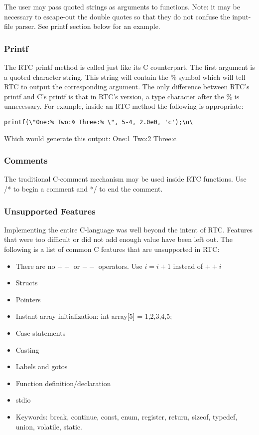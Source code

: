 The user may pass quoted strings as arguments to 
functions. Note: it may be necessary to escape-out the double quotes so that they
do not confuse the input-file parser. See printf section below for an example.

\subsubsection{Printf}

The RTC printf method is called just like its C counterpart. The first argument
is a quoted character string. This string will contain the \% symbol 
which will tell RTC to output the corresponding argument. The only difference
between RTC's printf and C's printf is that in RTC's version, a type character 
after the \% is unnecessary. For example, inside an RTC method
the following is appropriate:

{\ttfamily \begin{verbatim}
printf(\"One:% Two:% Three:% \", 5-4, 2.0e0, 'c');\n\
\end{verbatim} }

\noindent
Which would generate this output: One:1 Two:2 Three:c

\subsubsection{Comments}

The traditional C-comment mechanism may be used inside RTC
functions. Use /* to begin a comment and */ to end the comment.

\subsubsection{Unsupported Features}

Implementing the entire C-language was well beyond the intent of RTC. Features 
that were too difficult or did not add enough value have been left out. 
The following is a list of common C features that are unsupported in RTC:
\begin{itemize}
  \item There are no $++$ or $--$ operators. Use $i = i + 1$ instead of $++i$
  \item Structs
  \item Pointers
  \item Instant array initialization: int array[5] = {1,2,3,4,5};
  \item Case statements
  \item Casting
  \item Labels and gotos
  \item Function definition/declaration
  \item stdio
  \item Keywords: break, continue, const, enum, register, return, sizeof,
    typedef, union, volatile, static.
\end{itemize} 

